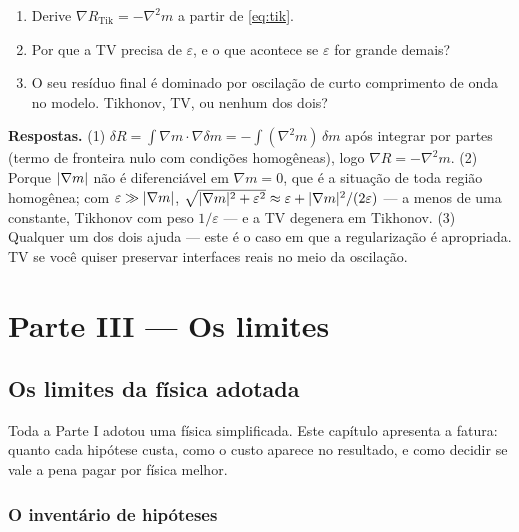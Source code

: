 \documentclass[11pt,a4paper,oneside]{report}
\begin{document}
\begin{exercicio}
\begin{enumerate}[leftmargin=*, itemsep=2pt]
\item Derive $\nabla R_{\text{Tik}} = -\nabla^{2}m$ a partir de
\eqref{eq:tik}.
\item Por que a TV precisa de $\varepsilon$, e o que acontece se
$\varepsilon$ for grande demais?
\item O seu res\'iduo final \'e dominado por oscila\c{c}\~ao de curto
comprimento de onda no modelo. Tikhonov, TV, ou nenhum dos dois?
\end{enumerate}
\textbf{Respostas.} (1) $\delta R = \int \nabla m\cdot\nabla\delta m
= -\int (\nabla^{2}m)\,\delta m$ ap\'os integrar por partes (termo de
fronteira nulo com condi\c{c}\~oes homog\^eneas), logo
$\nabla R = -\nabla^{2}m$. (2) Porque $\lvert \nabla m \rvert$ n\~ao \'e
diferenci\'avel em $\nabla m = 0$, que \'e a situa\c{c}\~ao de toda regi\~ao
homog\^enea; com $\varepsilon \gg \lvert \nabla m \rvert$,
$\sqrt{\lvert \nabla m \rvert^2+\varepsilon^2} \approx \varepsilon +
\lvert \nabla m \rvert^{2}/(2\varepsilon)$ --- a menos de uma constante, Tikhonov com
peso $1/\varepsilon$ --- e a TV degenera em Tikhonov. (3) Qualquer um dos dois
ajuda --- este \'e o caso em que a regulariza\c{c}\~ao \'e apropriada. TV se
voc\^e quiser preservar interfaces reais no meio da oscila\c{c}\~ao.
\end{exercicio}

\part*{\centering\color{azulfwi} Parte III --- Os limites}

\chapter{Os limites da f\'isica adotada}
\label{cap:limites}

\begin{ideia}
Toda a Parte I adotou uma f\'isica simplificada. Este cap\'itulo apresenta a
fatura: quanto cada hip\'otese custa, como o custo aparece no resultado, e
como decidir se vale a pena pagar por f\'isica melhor.
\end{ideia}

\section{O invent\'ario de hip\'oteses}
\end{document}
